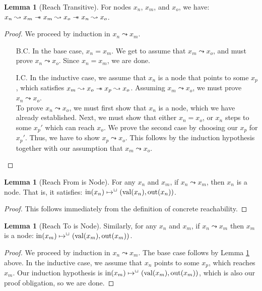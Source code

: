 \documentclass[a4paper, 10pt]{report}
\theoremstyle{definition}
\newtheorem{lemma}[theorem]{Lemma}
\newcommand{\nIn}[1]{\operatorname{in}(#1)}
\newcommand{\nVal}[1]{\operatorname{val}(#1)}
\newcommand{\nOut}[1]{\operatorname{out}(#1)}
\newcommand{\node}{x}
\newcommand{\nodeM}[1]{\node_{#1}}
\newcommand{\isNode}[1]{\nIn{#1} \mapsto^{\persistently} (\nVal{#1}, \nOut{#1})}
\newcommand{\reach}[2]{#1 \leadsto #2}
\begin{document}
\begin{lemma}[Reach Transitive]\label{lemma:reach-transitive}
  For nodes $\nodeM{n}$, $\nodeM{m}$, and $\nodeM{o}$, we have: $\reach{\nodeM{n}}{\nodeM{m}} \wand \reach{\nodeM{m}}{\nodeM{o}} \wand \reach{\nodeM{n}}{\nodeM{o}}$.
\end{lemma}
\begin{proof}
  We proceed by induction in $\reach{\nodeM{n}}{\nodeM{m}}$.
  \begin{itemize}
    \item[B.C.] In the base case, $\nodeM{n} = \nodeM{m}$. We get to assume that $\reach{\nodeM{m}}{\nodeM{o}}$, and must prove $\reach{\nodeM{n}}{\nodeM{o}}$. Since $\nodeM{n} = \nodeM{m}$, we are done.
    \item[I.C.] In the inductive case, we assume that $\nodeM{n}$ is a node that points to some $\nodeM{p}$, which satisfies $\reach{\nodeM{m}}{\nodeM{o}} \wand \reach{\nodeM{p}}{\nodeM{o}}$. Assuming $\reach{\nodeM{m}}{\nodeM{o}}$, we must prove $\reach{\nodeM{n}}{\nodeM{o}}$.\\
    To prove $\reach{\nodeM{n}}{\nodeM{o}}$, we must first show that $\nodeM{n}$ is a node, which we have already established. Next, we must show that either $\nodeM{n} = \nodeM{o}$, or $\nodeM{n}$ steps to some $\nodeM{p}'$ which can reach $\nodeM{o}$. We prove the second case by choosing our $\nodeM{p}$ for $\nodeM{p}'$. Thus, we have to show $\reach{\nodeM{p}}{\nodeM{o}}$. This follows by the induction hypothesis together with our assumption that $\reach{\nodeM{m}}{\nodeM{o}}$.
  \end{itemize}
\end{proof}

\begin{lemma}[Reach From is Node]\label{lemma:reach-from-is-node}
  For any $\nodeM{n}$ and $\nodeM{m}$, if $\reach{\nodeM{n}}{\nodeM{m}}$, then $\nodeM{n}$ is a node. That is, it satisfies: $\isNode{\nodeM{n}}$.
\end{lemma}
\begin{proof}
  This follows immediately from the definition of concrete reachability.
\end{proof}

\begin{lemma}[Reach To is Node]\label{lemma:reach-to-is-node}
  Similarly, for any $\nodeM{n}$ and $\nodeM{m}$, if $\reach{\nodeM{n}}{\nodeM{m}}$ then $\nodeM{m}$ is a node: $\isNode{\nodeM{m}}$.
\end{lemma}
\begin{proof}
  We proceed by induction in $\reach{\nodeM{n}}{\nodeM{m}}$. The base case follows by Lemma \ref{lemma:reach-from-is-node} above. In the inductive case, we assume that $\nodeM{n}$ points to some $\nodeM{p}$, which reaches $\nodeM{m}$. Our induction hypothesis is $\isNode{\nodeM{m}}$, which is also our proof obligation, so we are done.
\end{proof}
\end{document}
